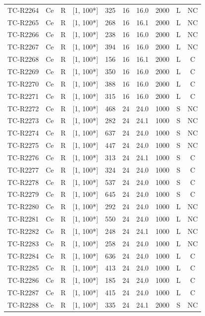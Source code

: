 \begin{longtable}{lccccccccc}
TC-R2264 & Ce & R & [1, 100*] & 325 & 16 & 16.0 & 2000 & L & NC \\
TC-R2265 & Ce & R & [1, 100*] & 268 & 16 & 16.1 & 2000 & L & NC \\
TC-R2266 & Ce & R & [1, 100*] & 238 & 16 & 16.0 & 2000 & L & NC \\
TC-R2267 & Ce & R & [1, 100*] & 394 & 16 & 16.0 & 2000 & L & NC \\
TC-R2268 & Ce & R & [1, 100*] & 156 & 16 & 16.1 & 2000 & L & C \\
TC-R2269 & Ce & R & [1, 100*] & 350 & 16 & 16.0 & 2000 & L & C \\
TC-R2270 & Ce & R & [1, 100*] & 388 & 16 & 16.0 & 2000 & L & C \\
TC-R2271 & Ce & R & [1, 100*] & 315 & 16 & 16.0 & 2000 & L & C \\
TC-R2272 & Ce & R & [1, 100*] & 468 & 24 & 24.0 & 1000 & S & NC \\
TC-R2273 & Ce & R & [1, 100*] & 282 & 24 & 24.1 & 1000 & S & NC \\
TC-R2274 & Ce & R & [1, 100*] & 637 & 24 & 24.0 & 1000 & S & NC \\
TC-R2275 & Ce & R & [1, 100*] & 447 & 24 & 24.0 & 1000 & S & NC \\
TC-R2276 & Ce & R & [1, 100*] & 313 & 24 & 24.1 & 1000 & S & C \\
TC-R2277 & Ce & R & [1, 100*] & 324 & 24 & 24.0 & 1000 & S & C \\
TC-R2278 & Ce & R & [1, 100*] & 537 & 24 & 24.0 & 1000 & S & C \\
TC-R2279 & Ce & R & [1, 100*] & 645 & 24 & 24.0 & 1000 & S & C \\
TC-R2280 & Ce & R & [1, 100*] & 292 & 24 & 24.0 & 1000 & L & NC \\
TC-R2281 & Ce & R & [1, 100*] & 550 & 24 & 24.0 & 1000 & L & NC \\
TC-R2282 & Ce & R & [1, 100*] & 248 & 24 & 24.1 & 1000 & L & NC \\
TC-R2283 & Ce & R & [1, 100*] & 258 & 24 & 24.0 & 1000 & L & NC \\
TC-R2284 & Ce & R & [1, 100*] & 636 & 24 & 24.0 & 1000 & L & C \\
TC-R2285 & Ce & R & [1, 100*] & 413 & 24 & 24.0 & 1000 & L & C \\
TC-R2286 & Ce & R & [1, 100*] & 185 & 24 & 24.0 & 1000 & L & C \\
TC-R2287 & Ce & R & [1, 100*] & 415 & 24 & 24.0 & 1000 & L & C \\
TC-R2288 & Ce & R & [1, 100*] & 335 & 24 & 24.1 & 2000 & S & NC \\

\end{longtable}
